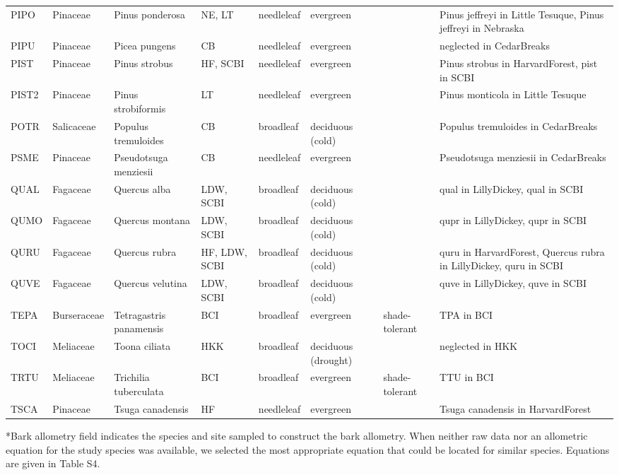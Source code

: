 \documentclass[
]{article}
\begin{document}
\begin{table}[!h]
{\begin{tabular}{lllllll>{\raggedright\arraybackslash}p{5cm}}
\addlinespace
PIPO & Pinaceae & Pinus ponderosa & NE, LT & needleleaf & evergreen &  & Pinus jeffreyi in Little Tesuque, Pinus jeffreyi in Nebraska\\
\addlinespace
PIPU & Pinaceae & Picea pungens & CB & needleleaf & evergreen &  & neglected in CedarBreaks\\
\addlinespace
PIST & Pinaceae & Pinus strobus & HF, SCBI & needleleaf & evergreen &  & Pinus strobus in HarvardForest, pist in SCBI\\
\addlinespace
PIST2 & Pinaceae & Pinus strobiformis & LT & needleleaf & evergreen &  & Pinus monticola in Little Tesuque\\
\addlinespace
POTR & Salicaceae & Populus tremuloides & CB & broadleaf & deciduous (cold) &  & Populus tremuloides in CedarBreaks\\
\addlinespace
PSME & Pinaceae & Pseudotsuga menziesii & CB & needleleaf & evergreen &  & Pseudotsuga menziesii in CedarBreaks\\
\addlinespace
QUAL & Fagaceae & Quercus alba & LDW, SCBI & broadleaf & deciduous (cold) &  & qual in LillyDickey, qual in SCBI\\
\addlinespace
QUMO & Fagaceae & Quercus montana & LDW, SCBI & broadleaf & deciduous (cold) &  & qupr in LillyDickey, qupr in SCBI\\
\addlinespace
QURU & Fagaceae & Quercus rubra & HF, LDW, SCBI & broadleaf & deciduous (cold) &  & quru in HarvardForest, Quercus rubra in LillyDickey, quru in SCBI\\
\addlinespace
QUVE & Fagaceae & Quercus velutina & LDW, SCBI & broadleaf & deciduous (cold) &  & quve in LillyDickey, quve in SCBI\\
\addlinespace
TEPA & Burseraceae & Tetragastris panamensis & BCI & broadleaf & evergreen & shade-tolerant & TPA in BCI\\
\addlinespace
TOCI & Meliaceae & Toona ciliata & HKK & broadleaf & deciduous (drought) &  & neglected in HKK\\
\addlinespace
TRTU & Meliaceae & Trichilia tuberculata & BCI & broadleaf & evergreen & shade-tolerant & TTU in BCI\\
\addlinespace
TSCA & Pinaceae & Tsuga canadensis & HF & needleleaf & evergreen &  & Tsuga canadensis in HarvardForest\\
\bottomrule
\end{tabular}}
\end{table}

*Bark allometry field indicates the species and site sampled to
construct the bark allometry. When neither raw data nor an allometric
equation for the study species was available, we selected the most
appropriate equation that could be located for similar species.
Equations are given in Table S4.
\end{document}
